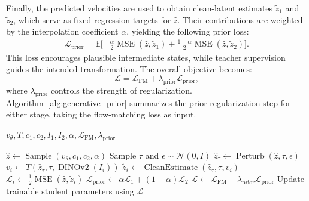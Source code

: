 Finally, the predicted velocities are used to obtain clean-latent estimates $\tilde z_1$ and $\tilde z_2$, which serve as fixed regression targets for $\hat z$. Their contributions are weighted by the interpolation coefficient $\alpha$, yielding the following prior loss:
\begin{equation}
 \begin{aligned}
 \mathcal L_{\mathrm{prior}}=\mathbb E\big[
 &\tfrac{\alpha}{2}
 \operatorname{MSE}(\hat z,\tilde z_1)
 +\tfrac{1-\alpha}{2}
 \operatorname{MSE}(\hat z,\tilde z_2)
 \big].
 \end{aligned}
 \label{eq:prior}
\end{equation}
This loss encourages plausible intermediate states, while teacher supervision guides the intended transformation. The overall objective becomes:
\begin{equation}
 \mathcal L=\mathcal L_{\mathrm{FM}}
 +\lambda_{\mathrm{prior}}\mathcal L_{\mathrm{prior}},
\end{equation}
where $\lambda_{\mathrm{prior}}$ controls the strength
of regularization. 
Algorithm~\ref{alg:generative_prior} summarizes the prior regularization step for either stage, taking the flow-matching loss as input.

\begin{algorithm}[t]
\caption{Generative-prior regularization.}
\label{alg:generative_prior}
\small
{}
\begin{algorithmic}[1]
\Require $v_\theta,T,c_1,c_2,I_1,I_2,\alpha,
\mathcal L_{\mathrm{FM}},\lambda_{\mathrm{prior}}$

\State $\hat z\gets
\operatorname{Sample}(v_\theta,c_1,c_2,\alpha)$
\State Sample $\tau$ and $\epsilon\sim\mathcal N(0,I)$
\State $\hat z_\tau\gets
\operatorname{Perturb}(\hat z,\tau,\epsilon)$
    \State $v_i\gets
    T(\hat z_\tau,\tau,\operatorname{DINOv2}(I_i))$
    \State $\tilde z_i\gets
    \operatorname{CleanEstimate}(\hat z_\tau,\tau,v_i)$
    \State $\mathcal L_i\gets
    \tfrac12\operatorname{MSE}(\hat z,\tilde z_i)$
\EndFor
\State $\mathcal L_{\mathrm{prior}}\gets
\alpha\mathcal L_1+(1-\alpha)\mathcal L_2$
\State $\mathcal L\gets\mathcal L_{\mathrm{FM}}
+\lambda_{\mathrm{prior}}\mathcal L_{\mathrm{prior}}$
\State Update trainable student parameters using $\mathcal L$
\end{algorithmic}
\end{algorithm}